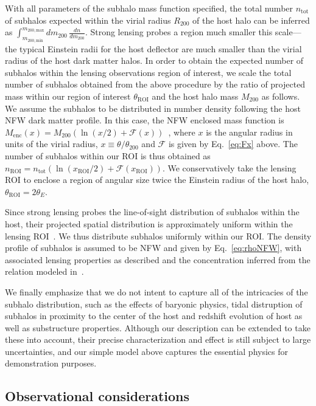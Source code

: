 \documentclass[twocolumn]{aastex62}
\newcommand{\mtwo}{m_{200}}
\newcommand{\Mtwo}{M_{200}}
\newcommand{\Rtwo}{R_{200}}
\begin{document}
With all parameters of the subhalo mass function specified, the total number $n_\mathrm{tot}$ of subhalos expected within the virial radius $\Rtwo$ of the host halo can be inferred as $\int_{m_\mathrm{200, min}}^{m_\mathrm{200, max}}d\mtwo\,\frac{dn}{d\mtwo}$. Strong lensing probes a region much smaller this scale---the typical Einstein radii for the host deflector are much smaller than the virial radius of the host dark matter halos. In order to obtain the expected number of subhalos within the lensing observations region of interest, we scale the total number of subhalos obtained from the above procedure by the ratio of projected mass within our region of interest $\theta_\textrm{ROI}$ and the host halo mass $\Mtwo$ as follows. We assume the subhalos to be distributed in number density following the host NFW dark matter profile. In this case, the NFW enclosed mass function is $M_\mathrm{enc}(x) = \Mtwo(\ln(x/2) + \mathcal{F}(x))$~\citep{2001astro.ph..2341K}, where $x$ is the angular radius in units of the virial radius, $x\equiv \theta/\theta_{200}$ and $\mathcal{F}$ is given by Eq.~\ref{eq:Fx} above. The number of subhalos within our ROI is thus obtained as $n_\mathrm{ROI} = n_\mathrm{tot} (\ln(x_\mathrm{ROI}/2) + \mathcal{F}(x_\mathrm{ROI}))$. We conservatively take the lensing ROI to enclose a region of angular size twice the Einstein radius of the host halo, $\theta_\mathrm{ROI} = 2\theta_E$.

Since strong lensing probes the line-of-sight distribution of subhalos within the host, their projected spatial distribution is approximately uniform within the lensing ROI~\citep{2017MNRAS.469.1997D}. We thus distribute subhalos uniformly within our ROI. The density profile of subhalos is assumed to be NFW and given by Eq.~\ref{eq:rhoNFW}, with associated lensing properties as described and the concentration inferred from the relation modeled in~\citet{2014MNRAS.442.2271S}.

We finally emphasize that we do not intent to capture all of the intricacies of the subhalo distribution, such as the effects of baryonic physics, tidal distruption of subhalos in proximity to the center of the host and redshift evolution of host as well as substructure properties. Although our description can be extended to take these into account, their precise characterization and effect is still subject to large uncertainties, and our simple model above captures the essential physics for demonstration purposes.

\subsection{Observational considerations}
\label{sec:observations}
\end{document}
